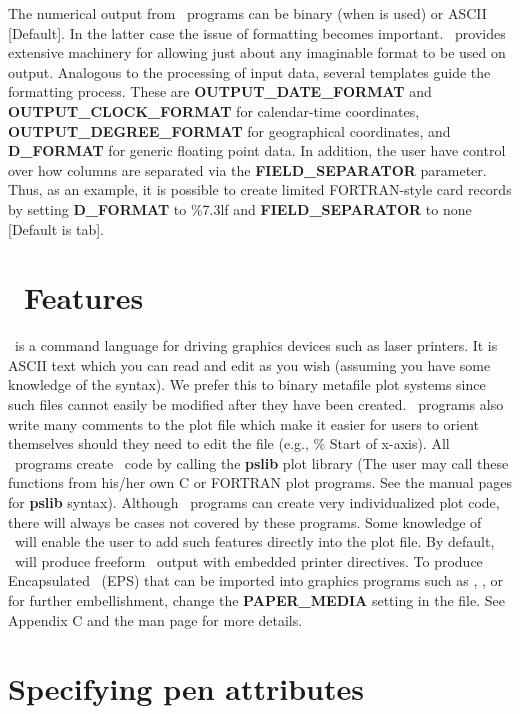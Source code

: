 The numerical output from \GMT\ programs can be binary (when  is used) or ASCII [Default].
In the latter case the issue of formatting becomes important.  \GMT\ provides extensive
machinery for allowing just about any imaginable format to be used on output.  Analogous to
the processing of input data, several templates guide the formatting process.  These are
{\bf OUTPUT\_DATE\_FORMAT} and {\bf OUTPUT\_CLOCK\_FORMAT} for calendar-time coordinates,
{\bf OUTPUT\_DEGREE\_FORMAT} for geographical coordinates, and {\bf D\_FORMAT} for generic
floating point data.  In addition, the user have control over how columns are separated via
the {\bf FIELD\_SEPARATOR} parameter.  Thus, as an example, it is possible to create limited
FORTRAN-style card records by setting {\bf D\_FORMAT} to \%7.3lf and {\bf FIELD\_SEPARATOR} to
none [Default is tab].

\section{\PS\ Features}
\PS\ is a command language for driving graphics
devices such as laser printers.  It is ASCII text which you
can read and edit as you wish (assuming you have some knowledge
of the syntax).  We prefer this to binary metafile plot
systems since such files cannot easily be modified after they
have been created.  \GMT\ programs also write many comments to
the plot file which make it easier for users to orient
themselves should they need to edit the file (e.g., \% Start
of x-axis).  All \GMT\ programs create \PS\ code by
calling the {\bf pslib} plot library (The user may call these
functions from his/her own C or FORTRAN plot programs. See the
manual pages for {\bf pslib} syntax).  Although \GMT\ programs
can create very individualized plot code, there will always be
cases not covered by these programs.  Some knowledge of
\PS\ will enable the user to add such features
directly into the plot file.  By default, \GMT\ will produce
freeform \PS\ output with embedded printer directives.  To
produce Encapsulated \PS\ (EPS) that can be imported into graphics programs such as
, ,  or  for further
embellishment, change the {\bf PAPER\_MEDIA} setting in the 
file.  See Appendix C and the  man page for more details.

\section{Specifying pen attributes}

